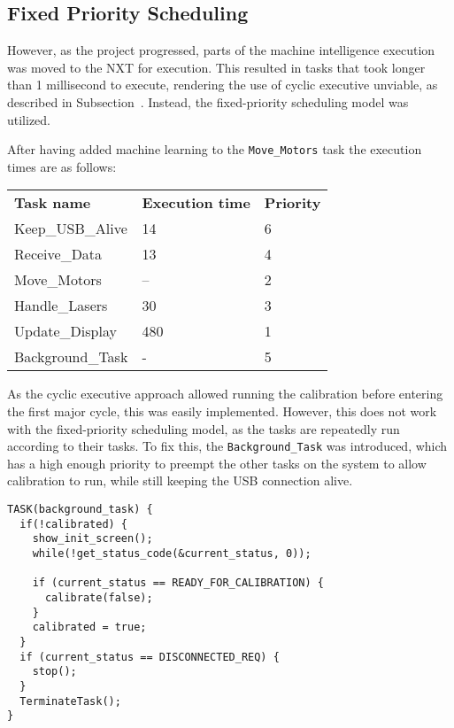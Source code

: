 \subsection{Fixed Priority Scheduling}
However, as the project progressed, parts of the machine intelligence execution was moved to the NXT for execution.
This resulted in tasks that took longer than 1 millisecond to execute, rendering the use of cyclic executive unviable, as described in Subsection~\cite{Design:Scheduling}.
Instead, the fixed-priority scheduling model was utilized.

After having added machine learning to the \texttt{Move\_Motors} task the execution times are as follows:

\begin{table}[tbp]
\begin{tabular}{lll}
\textbf{Task name}  & \textbf{Execution time} 	& \textbf{Priority}\\
Keep\_USB\_Alive    & 14                        & 6    \\
Receive\_Data       & 13                        & 4   \\
Move\_Motors        & --                        & 2   \\
Handle\_Lasers      & 30                        & 3   \\
Update\_Display     & 480                       & 1   \\
Background\_Task    & -                        	& 5  \\
\end{tabular}
\end{table}\label{table:executionTimes}

As the cyclic executive approach allowed running the calibration before entering the first major cycle, this was easily implemented.
However, this does not work with the fixed-priority scheduling model, as the tasks are repeatedly run according to their tasks.
To fix this, the \texttt{Background\_Task} was introduced, which has a high enough priority to preempt the other tasks on the system to allow calibration to run, while still keeping the USB connection alive.

\begin{lstlisting}[language=CSharp,label={lst:backgroundTask},caption={Background task}]
TASK(background_task) {
  if(!calibrated) {
    show_init_screen();
    while(!get_status_code(&current_status, 0));

    if (current_status == READY_FOR_CALIBRATION) {
      calibrate(false);
    }
    calibrated = true;
  }
  if (current_status == DISCONNECTED_REQ) {
    stop();
  }
  TerminateTask();
}
\end{lstlisting}

